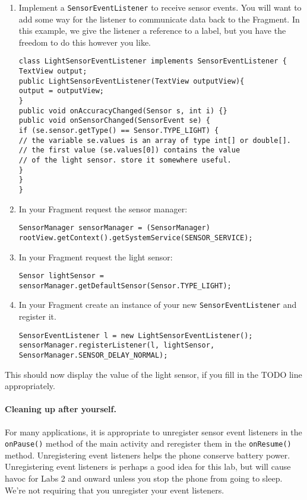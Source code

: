 \documentclass[10pt]{article}
\begin{document}
\begin{enumerate}
\item Implement a {\tt SensorEventListener} to receive sensor events. You will want to add some way for the listener to communicate data back to the Fragment. In this example, we give the listener a reference to a label, but you have the freedom to do this however you like.
\begin{verbatim}
class LightSensorEventListener implements SensorEventListener {
TextView output;
public LightSensorEventListener(TextView outputView){
output = outputView;
}
public void onAccuracyChanged(Sensor s, int i) {}
public void onSensorChanged(SensorEvent se) {
if (se.sensor.getType() == Sensor.TYPE_LIGHT) {
// the variable se.values is an array of type int[] or double[].
// the first value (se.values[0]) contains the value
// of the light sensor. store it somewhere useful.
}
}
}
\end{verbatim}
\item In your Fragment request the sensor manager:
\vspace*{-1em}
\begin{verbatim}
SensorManager sensorManager = (SensorManager)
rootView.getContext().getSystemService(SENSOR_SERVICE);
\end{verbatim}
\item In your Fragment request the light sensor:
\vspace*{-1em}
\begin{verbatim}
Sensor lightSensor =
sensorManager.getDefaultSensor(Sensor.TYPE_LIGHT);
\end{verbatim}
\item In your Fragment create an instance of your new {\tt SensorEventListener} and register it.
\vspace*{-1em}
\begin{verbatim}
SensorEventListener l = new LightSensorEventListener();
sensorManager.registerListener(l, lightSensor,
SensorManager.SENSOR_DELAY_NORMAL);
\end{verbatim}
\end{enumerate}
This should now display the value of the light sensor, if you fill in the TODO line
appropriately.
\vspace*{-0.5em}
\paragraph{Cleaning up after yourself.} For many applications, it is appropriate to unregister
sensor event listeners in the {\tt onPause()} method of the main
activity and reregister them in the {\tt onResume()}
method. Unregistering event listeners helps the phone conserve battery
power. Unregistering event listeners is perhaps a good idea for this
lab, but will cause havoc for Labs 2 and onward unless you stop the
phone from going to sleep. We're not requiring that you unregister your event listeners.
\end{document}
